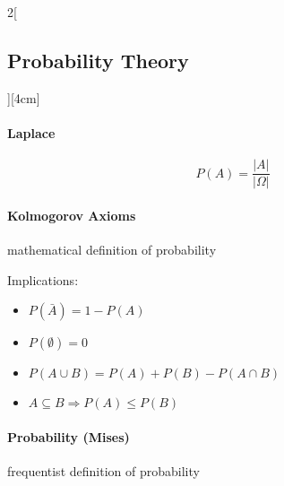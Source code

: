 \documentclass[8pt]{extarticle}
\begin{document}
\begin{multicols}{2}[\subsection{Probability Theory}][4cm]


\paragraph{Laplace}

$$P(A)=\frac{|A|}{|\Omega|}$$


\paragraph{Kolmogorov Axioms} mathematical definition of probability



\begin{Mathfolg}

\noindent Implications:
\begin{itemize}
\setlength\itemsep{0em}
\item $P(\bar{A})=1-P(A)$
\item $P(\emptyset)=0$
\item $P(A\cup B)=P(A)+P(B)-P(A\cap B)$
\item $A \subseteq B \Rightarrow P(A) \le P(B)$
\end{itemize}

\end{Mathfolg}

\paragraph{Probability (Mises)} frequentist definition of probability


\end{multicols}
\end{document}
